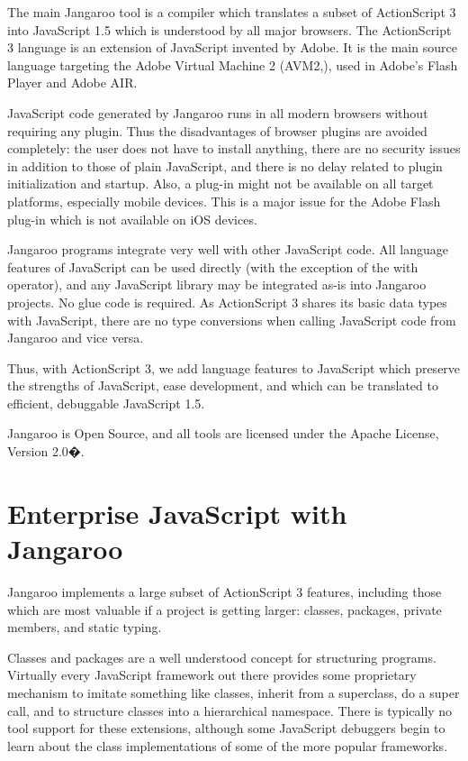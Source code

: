 \documentclass[10pt]{sigplanconf}
\begin{document}
The main Jangaroo tool is a compiler which translates a subset of ActionScript 3\citep{as3-overview} into JavaScript 1.5 which is understood by all major browsers.  The ActionScript 3 language is an extension of JavaScript invented by Adobe. It is the main source language targeting the Adobe Virtual Machine 2 (AVM2,\citep{avm2}), used in Adobe's Flash Player\citep{flashplayer} and Adobe AIR\citep{air}.

JavaScript code generated by Jangaroo runs in all modern browsers without requiring any plugin. Thus the disadvantages of browser plugins are avoided completely: the user does not have to install anything, there are no security issues in addition to those of plain JavaScript, and there is no delay related to plugin initialization and startup. Also, a plug-in might not be available on all target platforms, especially mobile devices. This is a major issue for the Adobe Flash plug-in which is not available on iOS devices.

Jangaroo programs integrate very well with other Java\-Script code. All language features of JavaScript can be used directly (with the exception of the with operator), and any JavaScript library may be integrated as-is into Jangaroo projects. No glue code is required. As ActionScript 3 shares its basic data types with JavaScript, there are no type conversions when calling JavaScript code from Jangaroo and vice versa.

Thus, with ActionScript 3, we add language features to JavaScript which preserve the strengths of JavaScript, ease development, and which can be translated to efficient, debuggable JavaScript 1.5.

Jangaroo is Open Source, and all tools are licensed under the Apache License, Version 2.0�\citep{joolicense}.

\section{Enterprise JavaScript with Jangaroo}

Jangaroo implements a large subset of ActionScript 3 features, including those which are most valuable if a project is getting larger: classes, packages, private members, and static typing.

Classes and packages are a well understood concept for structuring programs. Virtually every JavaScript framework out there provides some proprietary mechanism to imitate something like classes, inherit from a superclass, do a super call, and to structure classes into a hierarchical namespace. There is typically no tool support for these extensions, although some JavaScript debuggers begin to learn about the class implementations of some of the more popular frameworks\citep{firebug-plugin-illuminations}.
\end{document}
